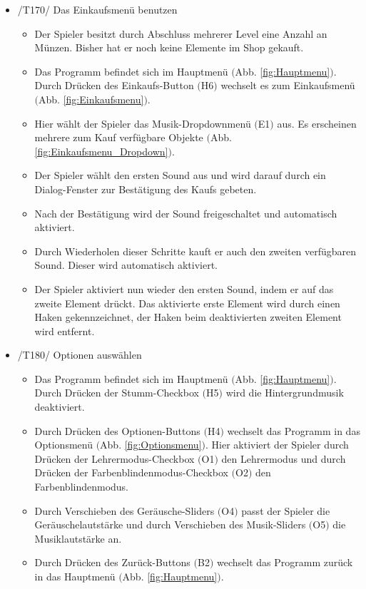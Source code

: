 \begin{itemize}
\item /T170/ Das Einkaufsmenü benutzen
\begin{itemize}
\item Der Spieler besitzt durch Abschluss mehrerer Level eine Anzahl an Münzen. Bisher hat er noch keine Elemente im Shop gekauft.
\item Das Programm befindet sich im Hauptmenü $($Abb. \ref{fig:Hauptmenu}$)$. Durch Drücken des Einkaufs-Button $($H6$)$ wechselt es zum Einkaufsmenü $($Abb. \ref{fig:Einkaufsmenu}$)$.
\item Hier wählt der Spieler das Musik-Dropdownmenü $($E1$)$ aus. Es erscheinen mehrere zum Kauf verfügbare Objekte $($Abb. \ref{fig:Einkaufsmenu_Dropdown}$)$.
\item Der Spieler wählt den ersten Sound aus und wird darauf durch ein Dialog-Fenster zur Bestätigung des Kaufs gebeten.
\item Nach der Bestätigung wird der Sound freigeschaltet und automatisch aktiviert.
\item Durch Wiederholen dieser Schritte kauft er auch den zweiten verfügbaren Sound. Dieser wird automatisch aktiviert.
\item Der Spieler aktiviert nun wieder den ersten Sound, indem er auf das zweite Element drückt. Das aktivierte erste Element wird durch einen Haken gekennzeichnet, der Haken beim deaktivierten zweiten Element wird entfernt.
\end{itemize}

\item /T180/ Optionen auswählen
\begin{itemize}
\item Das Programm befindet sich im Hauptmenü $($Abb. \ref{fig:Hauptmenu}$)$. Durch Drücken der Stumm-Checkbox $($H5$)$ wird die Hintergrundmusik deaktiviert.
\item Durch Drücken des Optionen-Buttons $($H4$)$ wechselt das Programm in das Optionsmenü $($Abb. \ref{fig:Optionsmenu}$)$. Hier aktiviert der Spieler durch Drücken der Lehrermodus-Checkbox $($O1$)$ den Lehrermodus und durch Drücken der Farbenblindenmodus-Checkbox $($O2$)$ den Farbenblindenmodus.
\item Durch Verschieben des Geräusche-Sliders $($O4$)$ passt der Spieler die Geräuschelautstärke und durch Verschieben des Musik-Sliders $($O5$)$ die Musiklautstärke an.
\item Durch Drücken des Zurück-Buttons $($B2$)$ wechselt das Programm zurück in das Hauptmenü $($Abb. \ref{fig:Hauptmenu}$)$.
\end{itemize}


\end{itemize}
